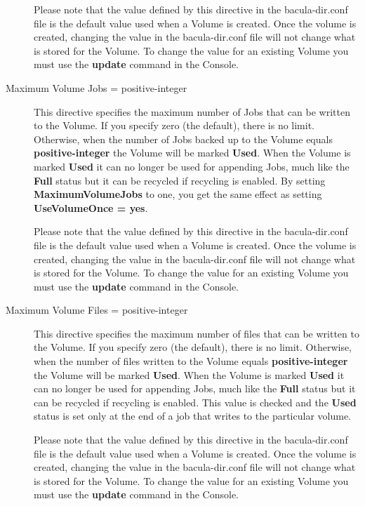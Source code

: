 \begin{description}
Please note that the value defined by this directive in the  bacula-dir.conf
file is the default value used when a Volume  is created. Once the volume is
created, changing the value  in the bacula-dir.conf file will not change what
is stored  for the Volume. To change the value for an existing Volume  you
must use the {\bf update} command in the Console.  

\item [Maximum Volume Jobs = \lt{}positive-integer\gt{}]
   This directive specifies  the maximum number of Jobs that can be written to
the Volume. If  you specify zero (the default), there is no limit. Otherwise, 
when the number of Jobs backed up to the Volume equals {\bf positive-integer} 
the Volume will be marked {\bf Used}. When the Volume is marked  {\bf Used} it
can no longer be used for appending Jobs, much like  the {\bf Full} status but
it can be recycled if recycling is enabled.  By setting {\bf
MaximumVolumeJobs} to one, you get the same  effect as setting {\bf
UseVolumeOnce = yes}.  

Please note that the value defined by this directive in the  bacula-dir.conf
file is the default value used when a Volume  is created. Once the volume is
created, changing the value  in the bacula-dir.conf file will not change what
is stored  for the Volume. To change the value for an existing Volume  you
must use the {\bf update} command in the Console.  

\item [Maximum Volume Files = \lt{}positive-integer\gt{}]
   This directive specifies  the maximum number of files that can be written to
the Volume. If  you specify zero (the default), there is no limit. Otherwise, 
when the number of files written to the Volume equals {\bf positive-integer} 
the Volume will be marked {\bf Used}. When the Volume is marked  {\bf Used} it
can no longer be used for appending Jobs, much like  the {\bf Full} status but
it can be recycled if recycling is enabled.  This value is checked and the
{\bf Used} status is set only  at the end of a job that writes to the
particular volume.  

Please note that the value defined by this directive in the  bacula-dir.conf
file is the default value used when a Volume  is created. Once the volume is
created, changing the value  in the bacula-dir.conf file will not change what
is stored  for the Volume. To change the value for an existing Volume  you
must use the {\bf update} command in the Console.  


\end{description}
